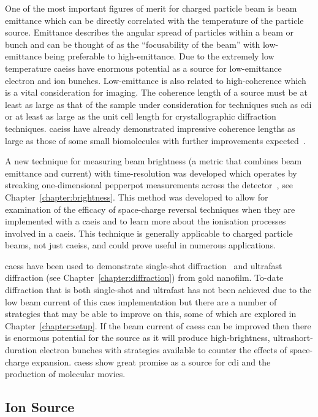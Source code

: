 One of the most important figures of merit for charged particle beam is beam emittance which can be directly correlated with the temperature of the particle source.
Emittance describes the angular spread of particles within a beam or bunch and can be thought of as the ``focusability of the beam'' with low-emittance being preferable to high-emittance.
Due to the extremely low temperature \glspl{caeis} have enormous potential as a source for low-emittance electron and ion bunches.
Low-emittance is also related to high-coherence which is a vital consideration for imaging.
The coherence length of a source must be at least as large as that of the sample under consideration for techniques such as \gls{cdi} or at least as large as the unit cell length for crystallographic diffraction techniques.
\Glspl{caeis} have already demonstrated impressive coherence lengths as large as those of some small biomolecules with further improvements expected~\cite{saliba_spatial_2012}.

A new technique for measuring beam brightness (a metric that combines beam emittance and current) with time-resolution was developed which operates by streaking one-dimensional pepperpot measurements across the detector~\cite{torrance_time-resolved_2018}, see Chapter~\ref{chapter:brightness}.
This method was developed to allow for examination of the efficacy of space-charge reversal techniques when they are implemented with a \gls{caeis} and to learn more about the ionisation processes involved in a \gls{caeis}.
This technique is generally applicable to charged particle beams, not just \glspl{caeis}, and could prove useful in numerous applications.

\Glspl{caes} have been used to demonstrate single-shot diffraction~\cite{speirs_single-shot_2015} and ultrafast diffraction (see Chapter~\ref{chapter:diffraction}) from gold nanofilm.
To-date diffraction that is both single-shot and ultrafast has not been achieved due to the low beam current of this \gls{caes} implementation but there are a number of strategies that may be able to improve on this, some of which are explored in Chapter~\ref{chapter:setup}.
If the beam current of \glspl{caes} can be improved then there is enormous potential for the source as it will produce high-brightness, ultrashort-duration electron bunches with strategies available to counter the effects of space-charge expansion.
\Glspl{caes} show great promise as a source for \gls{cdi} and the production of molecular movies.

\subsection{Ion Source}

